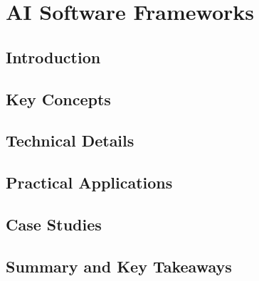 ﻿%

\chapter{AI Software Frameworks}
\label{ch:chapter-15}

\section{Introduction}


\section{Key Concepts}


\section{Technical Details}


\section{Practical Applications}


\section{Case Studies}


\section{Summary and Key Takeaways}


